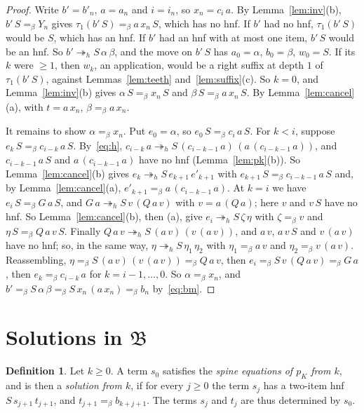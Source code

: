 \documentclass[11pt]{amsart}
\theoremstyle{definition}
\newtheorem{definition}[theorem]{Definition}
\newcommand{\hred}{\twoheadrightarrow_h}
\newcommand{\conv}{=_\beta}
\newcommand{\pK}{p_K}
\newcommand{\B}{\mathfrak B}
\begin{document}
\begin{proof}
Write $b'=b'_n$, $a=a_n$ and $i=i_n$, so $x_n=c_i\,a$. By Lemma~\ref{lem:inv}(b),
$b'\,S\conv Y_n$ gives $\tau_1(b'\,S)\conv a\,x_n\,S$, which has no hnf. If $b'$ had no hnf,
$\tau_1(b'\,S)$ would be $S$, which has an hnf. If $b'$ had an hnf with at most one item, $b'\,S$
would be an hnf. So
$b'\hred S\,\alpha\,\beta$, and the move on $b'\,S$ has $a_0=\alpha$, $b_0=\beta$, $w_0=S$. If its $k$
were $\ge1$, then $w_k$, an application, would be a right suffix at depth $1$ of $\tau_1(b'\,S)$,
against Lemmas~\ref{lem:teeth} and~\ref{lem:suffix}(c). So $k=0$, and Lemma~\ref{lem:inv}(b) gives
$\alpha\,S\conv x_n\,S$ and $\beta\,S\conv a\,x_n\,S$. By Lemma~\ref{lem:cancel}(a), with $t=a\,x_n$,
$\beta\conv a\,x_n$.

It remains to show $\alpha\conv x_n$. Put $e_0=\alpha$, so $e_0\,S\conv c_i\,a\,S$. For $k<i$,
suppose $e_k\,S\conv c_{i-k}\,a\,S$. By~\eqref{eq:h},
$c_{i-k}\,a\hred S\,(c_{i-k-1}\,a)\,(a\,(c_{i-k-1}\,a))$, and $c_{i-k-1}\,a\,S$ and
$a\,(c_{i-k-1}\,a)$ have no hnf (Lemma~\ref{lem:pk}(b)). So Lemma~\ref{lem:cancel}(b) gives
$e_k\hred S\,e_{k+1}\,e'_{k+1}$ with $e_{k+1}\,S\conv c_{i-k-1}\,a\,S$ and, by
Lemma~\ref{lem:cancel}(a), $e'_{k+1}\conv a\,(c_{i-k-1}\,a)$. At $k=i$ we have $e_i\,S\conv G\,a\,S$,
and $G\,a\hred S\,v\,(Q\,a\,v)$ with $v=a\,(Q\,a)$; here $v$ and $v\,S$ have no hnf. So
Lemma~\ref{lem:cancel}(b), then (a), give $e_i\hred S\,\zeta\,\eta$ with $\zeta\conv v$ and
$\eta\,S\conv Q\,a\,v\,S$. Finally $Q\,a\,v\hred S\,(a\,v)\,(v\,(a\,v))$, and $a\,v$, $a\,v\,S$ and
$v\,(a\,v)$ have no hnf; so, in the same way, $\eta\hred S\,\eta_1\,\eta_2$ with $\eta_1\conv a\,v$ and
$\eta_2\conv v\,(a\,v)$. Reassembling,
$\eta\conv S\,(a\,v)\,(v\,(a\,v))\conv Q\,a\,v$, then $e_i\conv S\,v\,(Q\,a\,v)\conv G\,a$, then $e_k\conv c_{i-k}\,a$ for
$k=i-1,\dots,0$. So $\alpha\conv x_n$, and
$b'\conv S\,\alpha\,\beta\conv S\,x_n\,(a\,x_n)\conv b_n$ by~\eqref{eq:bm}.
\end{proof}

\section{Solutions in \texorpdfstring{$\B$}{B}}\label{sec:world}

\begin{definition}
Let $k\ge0$. A term $s_0$ satisfies the \emph{spine equations of $\pK$ from $k$}, and is then a
\emph{solution from $k$}, if for every $j\ge0$ the term $s_j$ has a two-item hnf
$S\,s_{j+1}\,t_{j+1}$, and $t_{j+1}\conv b_{k+j+1}$. The terms $s_j$ and $t_j$ are thus
determined by $s_0$.
\end{definition}
\end{document}
